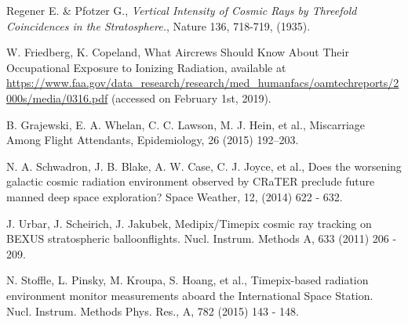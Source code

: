 




\begin{thebibliography}{00}

  Regener E. \& Pfotzer G., \textit{Vertical Intensity of Cosmic Rays by Threefold Coincidences in the Stratosphere.}, Nature 136, 718-719, (1935). 
  
  W. Friedberg, K. Copeland, What Aircrews Should Know About Their Occupational Exposure to Ionizing Radiation, available at \url{https://www.faa.gov/data_research/research/med_humanfacs/oamtechreports/2000s/media/0316.pdf} (accessed on February 1st, 2019).
    
  B. Grajewski, E. A. Whelan, C. C. Lawson, M. J. Hein, et al., Miscarriage Among Flight Attendants, Epidemiology, 26 (2015) 192–203.

  N. A. Schwadron, J. B. Blake, A. W. Case, C. J. Joyce, et al., Does the worsening galactic cosmic radiation environment observed by CRaTER preclude future manned deep space exploration? Space Weather, 12, (2014) 622 - 632.

  J. Urbar, J. Scheirich, J. Jakubek, Medipix/Timepix cosmic ray tracking on BEXUS stratospheric balloonflights. Nucl. Instrum. Methods A, 633 (2011) 206 - 209.

 N. Stoffle, L. Pinsky, M. Kroupa, S. Hoang, et al., Timepix-based radiation environment monitor measurements aboard the International Space Station. Nucl. Instrum. Methods Phys. Res., A, 782 (2015) 143 - 148.


\end{thebibliography}
